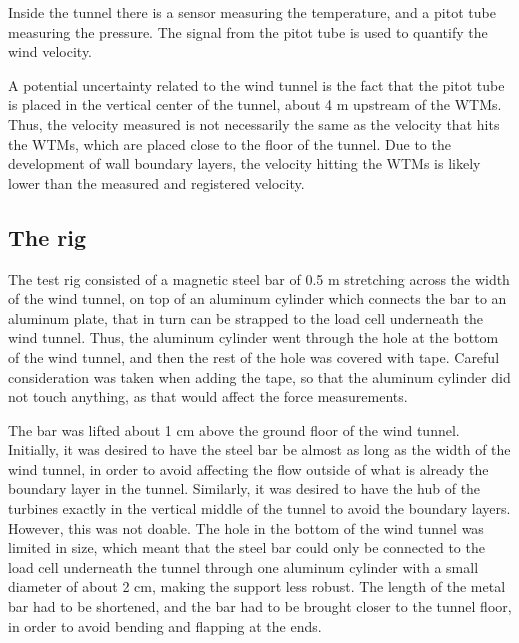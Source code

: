 Inside the tunnel there is a sensor measuring the temperature, and a pitot tube measuring the pressure. The signal from the pitot tube is used to quantify the wind velocity. 
% 

A potential uncertainty related to the wind tunnel is the fact that the pitot tube is placed in the vertical center of the tunnel, about 4 m upstream of the \gls{WTM}s. Thus, the velocity measured is not necessarily the same as the velocity that hits the \gls{WTM}s, which are placed close to the floor of the tunnel. Due to the development of wall boundary layers, the velocity hitting the \gls{WTM}s is likely lower than the measured and registered velocity. 


\subsection{The rig} 
The test rig consisted of a magnetic steel bar of 0.5 \si{\m} stretching across the width of the wind tunnel, on top of an aluminum cylinder which connects the bar to an aluminum plate, that in turn can be strapped to the load cell underneath the wind tunnel. Thus, the aluminum cylinder went through the hole at the bottom of the wind tunnel, and then the rest of the hole was covered with tape. Careful consideration was taken when adding the tape, so that the aluminum cylinder did not touch anything, as that would affect the force measurements. 

The bar was lifted about 1 cm above the ground floor of the wind tunnel. Initially, it was desired to have the steel bar be almost as long as the width of the wind tunnel, in order to avoid affecting the flow outside of what is already the boundary layer in the tunnel. Similarly, it was desired to have the hub of the turbines exactly in the vertical middle of the tunnel to avoid the boundary layers. However, this was not doable. The hole in the bottom of the wind tunnel was limited in size, which meant that the steel bar could only be connected to the load cell underneath the tunnel through one aluminum cylinder with a small diameter of about 2 cm, making the support less robust. The length of the metal bar had to be shortened, and the bar had to be brought closer to the tunnel floor, in order to avoid bending and flapping at the ends.






